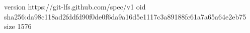 version https://git-lfs.github.com/spec/v1
oid sha256:da98c118ad2fddfd90f0de0f6da9a16d5e1117c3a89188fc61a7a65a64e2eb75
size 1576
